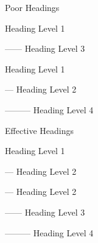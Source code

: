 \documentclass[presentation]{beamer}
\begin{document}
\begin{frame}[label={sec:org7d32e61}]{Poor Headings}
\begin{block}{Heading Level 1}
\begin{block}{------ Heading Level 3}
\end{block}
\end{block}
\begin{block}{Heading Level 1}
\begin{block}{--- Heading Level 2}
\begin{block}{--------- Heading Level 4}
\end{block}
\end{block}
\end{block}
\end{frame}
\begin{frame}[label={sec:org5372807}]{Effective Headings}
\begin{block}{Heading Level 1}
\begin{block}{--- Heading Level 2}
\end{block}
\begin{block}{--- Heading Level 2}
\begin{block}{------ Heading Level 3}
\begin{block}{--------- Heading Level 4}
\end{block}
\end{block}
\end{block}
\end{block}
\end{frame}
\end{document}
